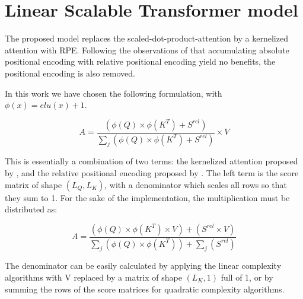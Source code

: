 \section{Linear Scalable Transformer
model}

The proposed model replaces the scaled-dot-product-attention by a
kernelized attention with RPE. Following the observations of
\citet{shaw2018selfattention} that
accumulating absolute positional encoding with relative positional
encoding yield no benefits, the positional encoding is also removed.

In this work we have chosen the following formulation, with
$\phi(x) = elu(x) + 1$.

\begin{equation}
A = \frac{\left( \phi(Q) \times \phi(K^T) + S^{rel} \right)}{\sum_j \left( \phi(Q) \times \phi(K^T) + S^{rel} \right)} \times V
\end{equation}

This is essentially a combination of two terms: the kernelized attention
proposed by  \citet{katharopoulos2020transformers}, and the relative positional encoding proposed by
\citet{shaw2018selfattention}. The left
term is the score matrix of shape $(L_Q, L_K)$, with a denominator
which scales all rows so that they sum to 1. For the sake of the
implementation, the multiplication must be distributed as:

\begin{equation}
A = \frac{\left( \phi(Q) \times \phi(K^T) \times V \right) + \left( S^{rel} \times V\right)}{\sum_j \left( \phi(Q) \times \phi(K^T) \right) + \sum_j \left( S^{rel} \right)}
\end{equation}

The denominator can be easily calculated by applying the linear complexity algorithms with V replaced by a matrix of shape
$(L_K, 1)$ full of 1, or by summing the rows of the score matrices for quadratic complexity algorithms.

\endinput
